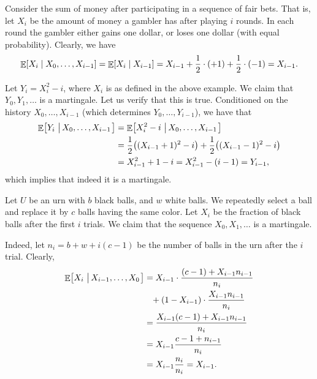 \begin{example}
    Consider the sum of money after participating in a sequence of
    fair bets. That is, let $X_i$ be the amount of money a gambler has
    after playing $i$ rounds. In each round the gambler either gains one
    dollar, or loses one dollar (with equal probability). Clearly, we
    have
    \begin{equation*}
        \ExCond{ X_i}{ X_0,\ldots, X_{i-1}}%
        =%
        \ExCond{X_i}{ X_{i-1}}%
        =%
        X_{i-1}
        +
        \frac{1}{2} \cdot (+1)
        +
        \frac{1}{2} \cdot (-1)
        =%
        X_{i-1}.
    \end{equation*}
\end{example}

\begin{example}
    Let $Y_i = X_i^2 - i$, where $X_i$ is as defined in the above
    example. We claim that $Y_0, Y_1, \ldots$ is a martingale. Let us
    verify that this is true. Conditioned on the history
    $X_0, \ldots, X_{i-1}$ (which determines $Y_0, \ldots, Y_{i-1}$),
    we have that
    \begin{align*}
        \Ex{Y_{i} \sep{ X_0, \ldots, X_{i-1}}}%
        &=%
        \Ex{X_i^2 - i \sep{ X_0, \ldots, X_{i-1}}}%
        \\
        &=%
        \frac{1}{2} \pth{ (X_{i-1}+1)^2 - i } + \frac{1}{2}
        \pth{ (X_{i-1}-1)^2 - i }\\
        &=%
        X_{i-1}^2 + 1 - i%
        =%
        X_{i-1}^2 - (i-1)%
        =%
        Y_{i-1},
    \end{align*}
    which implies that indeed it is a martingale.
\end{example}


\begin{example}
    Let $U$ be an urn with $b$ black balls, and $w$ white balls. We
    repeatedly select a ball and replace it by $c$ balls having the
    same color. Let $X_i$ be the fraction of black balls after the
    first $i$ trials.  We claim that the sequence $X_0, X_1, \ldots$
    is a martingale.

    Indeed, let $n_i = b + w + i(c-1)$ be the number of balls in the
    urn after the $i$\th trial. Clearly,
    \begin{align*}
        \Ex{ X_i \sep{X_{i-1}, \ldots, X_0}}%
        &=%
        X_{i-1} \cdot \frac{(c-1) + X_{i-1}n_{i-1}}{n_{i}}%
        \\& \phantom{=}%
        + (1 - X_{i-1}) \cdot \frac{X_{i-1}n_{i-1}}{n_{i}}%
        \\&%
        =%
        \frac{X_{i-1}(c-1) + X_{i-1}n_{i-1}}{n_i}
        \\&%
        =%
        X_{i-1} \frac{c-1 + n_{i-1}}{n_i}
        \\&%
        =%
        X_{i-1} \frac{n_{i}}{n_i} = X_{i-1}.
    \end{align*}
\end{example}


